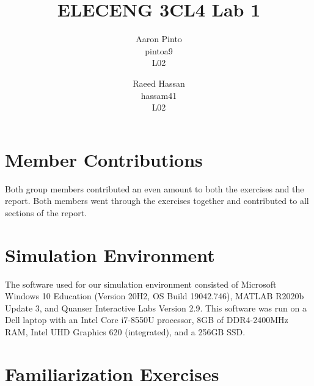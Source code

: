 \documentclass[12pt]{article}
\title{ELECENG 3CL4 Lab 1}
\author{
    Aaron Pinto \\
    pintoa9 \\
    L02
    \and
    Raeed Hassan \\
    hassam41 \\
    L02
}
\begin{document}
\maketitle
\clearpage

\section*{Member Contributions}
Both group members contributed an even amount to both the exercises and the report. Both members went through the exercises together and contributed to all sections of the report.

\section*{Simulation Environment}
The software used for our simulation environment consisted of Microsoft Windows 10 Education (Version 20H2, OS Build 19042.746), MATLAB R2020b Update 3, and Quanser Interactive Labs Version 2.9. This software was run on a Dell laptop with an Intel Core i7-8550U processor, 8GB of DDR4-2400MHz RAM, Intel UHD Graphics 620 (integrated), and a 256GB SSD.

\section*{Familiarization Exercises} %
\end{document}
